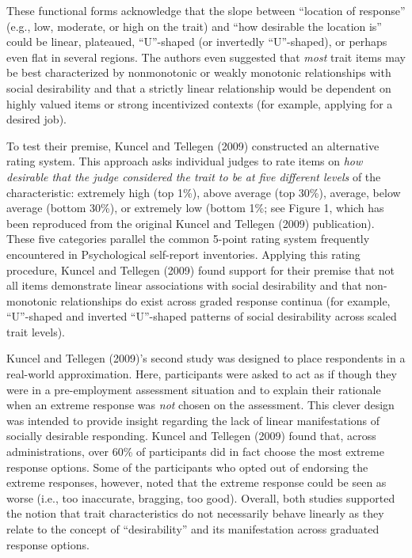 \documentclass[
  ,man]{apa6}
\begin{document}
These functional forms acknowledge that the slope between ``location of response'' (e.g., low, moderate, or high on the trait) and ``how desirable the location is'' could be linear, plateaued, ``U''-shaped (or invertedly ``U''-shaped), or perhaps even flat in several regions. The authors even suggested that \emph{most} trait items may be best characterized by nonmonotonic or weakly monotonic relationships with social desirability and that a strictly linear relationship would be dependent on highly valued items or strong incentivized contexts (for example, applying for a desired job).

To test their premise, Kuncel and Tellegen (2009) constructed an alternative rating system. This approach asks individual judges to rate items on \emph{how desirable that the judge considered the trait to be at five different levels} of the characteristic: extremely high (top 1\%), above average (top 30\%), average, below average (bottom 30\%), or extremely low (bottom 1\%; see Figure 1, which has been reproduced from the original Kuncel and Tellegen (2009) publication). These five categories parallel the common 5-point rating system frequently encountered in Psychological self-report inventories. Applying this rating procedure, Kuncel and Tellegen (2009) found support for their premise that not all items demonstrate linear associations with social desirability and that non-monotonic relationships do exist across graded response continua (for example, ``U''-shaped and inverted ``U''-shaped patterns of social desirability across scaled trait levels).

Kuncel and Tellegen (2009)'s second study was designed to place respondents in a real-world approximation. Here, participants were asked to act as if though they were in a pre-employment assessment situation and to explain their rationale when an extreme response was \emph{not} chosen on the assessment. This clever design was intended to provide insight regarding the lack of linear manifestations of socially desirable responding. Kuncel and Tellegen (2009) found that, across administrations, over 60\% of participants did in fact choose the most extreme response options. Some of the participants who opted out of endorsing the extreme responses, however, noted that the extreme response could be seen as worse (i.e., too inaccurate, bragging, too good). Overall, both studies supported the notion that trait characteristics do not necessarily behave linearly as they relate to the concept of ``desirability'' and its manifestation across graduated response options.
\end{document}
